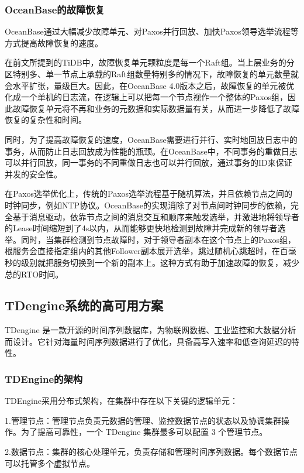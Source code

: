 \subsubsection{OceanBase的故障恢复}

OceanBase通过大幅减少故障单元、对Paxos并行回放、加快Paxos领导选举流程等方式提高故障恢复的速度。

在前文所提到的TiDB中，故障恢复单元颗粒度是每一个Raft组。当上层业务的分区特别多、单一节点上承载的Raft组数量特别多的情况下，故障恢复的单元数量就会水平扩张，量级巨大。因此，在OceanBase 4.0版本之后，故障恢复的单元被优化成一个单机的日志流，在逻辑上可以把每一个节点视作一个整体的Paxos组，因此故障恢复单元将不再和业务的元数据和实际数据量有关，从而进一步降低了故障恢复的复杂性和时间。

同时，为了提高故障恢复的速度，OceanBase需要进行并行、实时地回放日志中的事务，从而防止日志回放成为性能的瓶颈。在OceanBase中，不同事务的重做日志可以并行回放，同一事务的不同重做日志也可以并行回放，通过事务的ID来保证并发的安全性。

在Paxos选举优化上，传统的Paxos选举流程基于随机算法，并且依赖节点之间的时钟同步，例如NTP协议。OceanBase的实现消除了对节点间时钟同步的依赖，完全基于消息驱动，依靠节点之间的消息交互和顺序来触发选举，并激进地将领导者的Lease时间缩短到了4s以内，从而能够更快地检测到故障并完成新的领导者选举。同时，当集群检测到节点故障时，对于领导者副本在这个节点上的Paxos组，根服务会直接指定组内的其他Follower副本展开选举，跳过随机心跳超时，在百毫秒的级别就把服务切换到一个新的副本上。这种方式有助于加速故障的恢复，减少总的RTO时间。


\subsection{TDengine系统的高可用方案}

TDengine 是一款开源的时间序列数据库，为物联网数据、工业监控和大数据分析而设计。它针对海量时间序列数据进行了优化，具备高写入速率和低查询延迟的特性。

\subsubsection{TDEngine的架构}

TDEngine采用分布式架构，在集群中存在以下关键的逻辑单元：

1.管理节点：管理节点负责元数据的管理、监控数据节点的状态以及协调集群操作。为了提高可靠性，一个 TDengine 集群最多可以配置 3 个管理节点。

2.数据节点：集群的核心处理单元，负责存储和管理时间序列数据。每个数据节点可以托管多个虚拟节点。

